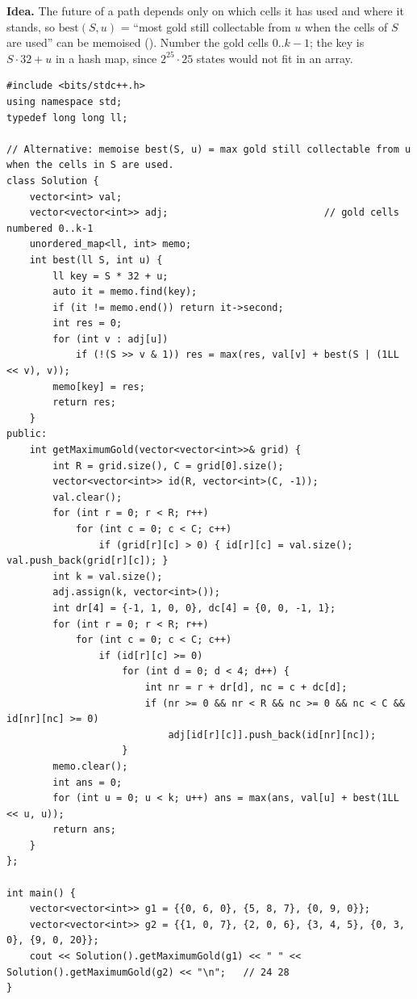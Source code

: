\begin{alternativebox}
\textbf{Idea.} The future of a path depends only on which cells it has used and where it stands, so $\text{best}(S, u)$ = ``most gold still collectable from $u$ when the cells of $S$ are used'' can be memoised (). Number the gold cells $0..k-1$; the key is $S \cdot 32 + u$ in a hash map, since $2^{25} \cdot 25$ states would not fit in an array.

\begin{lstlisting}[style=cpp]
#include <bits/stdc++.h>
using namespace std;
typedef long long ll;

// Alternative: memoise best(S, u) = max gold still collectable from u when the cells in S are used.
class Solution {
    vector<int> val;
    vector<vector<int>> adj;                           // gold cells numbered 0..k-1
    unordered_map<ll, int> memo;
    int best(ll S, int u) {
        ll key = S * 32 + u;
        auto it = memo.find(key);
        if (it != memo.end()) return it->second;
        int res = 0;
        for (int v : adj[u])
            if (!(S >> v & 1)) res = max(res, val[v] + best(S | (1LL << v), v));
        memo[key] = res;
        return res;
    }
public:
    int getMaximumGold(vector<vector<int>>& grid) {
        int R = grid.size(), C = grid[0].size();
        vector<vector<int>> id(R, vector<int>(C, -1));
        val.clear();
        for (int r = 0; r < R; r++)
            for (int c = 0; c < C; c++)
                if (grid[r][c] > 0) { id[r][c] = val.size(); val.push_back(grid[r][c]); }
        int k = val.size();
        adj.assign(k, vector<int>());
        int dr[4] = {-1, 1, 0, 0}, dc[4] = {0, 0, -1, 1};
        for (int r = 0; r < R; r++)
            for (int c = 0; c < C; c++)
                if (id[r][c] >= 0)
                    for (int d = 0; d < 4; d++) {
                        int nr = r + dr[d], nc = c + dc[d];
                        if (nr >= 0 && nr < R && nc >= 0 && nc < C && id[nr][nc] >= 0)
                            adj[id[r][c]].push_back(id[nr][nc]);
                    }
        memo.clear();
        int ans = 0;
        for (int u = 0; u < k; u++) ans = max(ans, val[u] + best(1LL << u, u));
        return ans;
    }
};

int main() {
    vector<vector<int>> g1 = {{0, 6, 0}, {5, 8, 7}, {0, 9, 0}};
    vector<vector<int>> g2 = {{1, 0, 7}, {2, 0, 6}, {3, 4, 5}, {0, 3, 0}, {9, 0, 20}};
    cout << Solution().getMaximumGold(g1) << " " << Solution().getMaximumGold(g2) << "\n";   // 24 28
}
\end{lstlisting}


\end{alternativebox}
